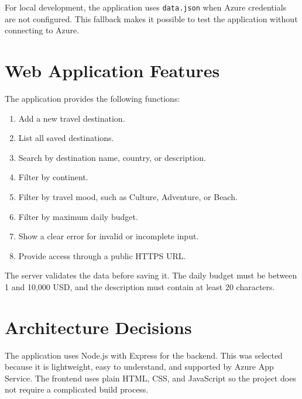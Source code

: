 \documentclass[12pt,a4paper]{article}
\begin{document}
For local development, the application uses \texttt{data.json} when Azure credentials are not configured. This fallback makes it possible to test the application without connecting to Azure.

\section{Web Application Features}

The application provides the following functions:
\begin{enumerate}
  \item Add a new travel destination.
  \item List all saved destinations.
  \item Search by destination name, country, or description.
  \item Filter by continent.
  \item Filter by travel mood, such as Culture, Adventure, or Beach.
  \item Filter by maximum daily budget.
  \item Show a clear error for invalid or incomplete input.
  \item Provide access through a public HTTPS URL.
\end{enumerate}

The server validates the data before saving it. The daily budget must be between 1 and 10,000 USD, and the description must contain at least 20 characters.



\section{Architecture Decisions}

The application uses Node.js with Express for the backend. This was selected because it is lightweight, easy to understand, and supported by Azure App Service. The frontend uses plain HTML, CSS, and JavaScript so the project does not require a complicated build process.
\end{document}
